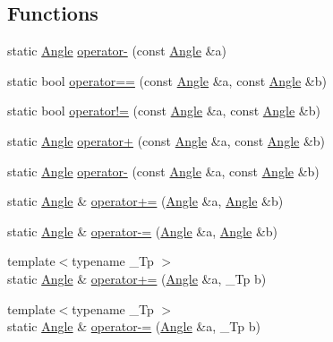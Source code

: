 \subsection*{Functions}
\begin{DoxyCompactItemize}
\item 
static \hyperlink{classnubot_1_1Angle}{Angle} \hyperlink{namespacenubot_aa8ca6af34711fca90938c0880bb15c49}{operator-\/} (const \hyperlink{classnubot_1_1Angle}{Angle} \&a)
\item 
static bool \hyperlink{namespacenubot_af329ad82a05c28a0fc51c500e537fe55}{operator==} (const \hyperlink{classnubot_1_1Angle}{Angle} \&a, const \hyperlink{classnubot_1_1Angle}{Angle} \&b)
\item 
static bool \hyperlink{namespacenubot_a40e374c97f88169b69143eb1d923d496}{operator!=} (const \hyperlink{classnubot_1_1Angle}{Angle} \&a, const \hyperlink{classnubot_1_1Angle}{Angle} \&b)
\item 
static \hyperlink{classnubot_1_1Angle}{Angle} \hyperlink{namespacenubot_abb3de2047a7eae0cfc3700ef06c42531}{operator+} (const \hyperlink{classnubot_1_1Angle}{Angle} \&a, const \hyperlink{classnubot_1_1Angle}{Angle} \&b)
\item 
static \hyperlink{classnubot_1_1Angle}{Angle} \hyperlink{namespacenubot_a178d1f0ed2ef537f9e364bbd5596f65a}{operator-\/} (const \hyperlink{classnubot_1_1Angle}{Angle} \&a, const \hyperlink{classnubot_1_1Angle}{Angle} \&b)
\item 
static \hyperlink{classnubot_1_1Angle}{Angle} \& \hyperlink{namespacenubot_a61c07c4190cbbde322307bcf1152bb84}{operator+=} (\hyperlink{classnubot_1_1Angle}{Angle} \&a, \hyperlink{classnubot_1_1Angle}{Angle} \&b)
\item 
static \hyperlink{classnubot_1_1Angle}{Angle} \& \hyperlink{namespacenubot_a9f354e0f2d292ee266b97e92ff8d3e2d}{operator-\/=} (\hyperlink{classnubot_1_1Angle}{Angle} \&a, \hyperlink{classnubot_1_1Angle}{Angle} \&b)
\item 
{\footnotesize template$<$typename \-\_\-\-Tp $>$ }\\static \hyperlink{classnubot_1_1Angle}{Angle} \& \hyperlink{namespacenubot_a74ae3fab7d3549c26fe7f9522ad0c269}{operator+=} (\hyperlink{classnubot_1_1Angle}{Angle} \&a, \-\_\-\-Tp b)
\item 
{\footnotesize template$<$typename \-\_\-\-Tp $>$ }\\static \hyperlink{classnubot_1_1Angle}{Angle} \& \hyperlink{namespacenubot_a8b3e71c1f93f2750899624ab045dc8ed}{operator-\/=} (\hyperlink{classnubot_1_1Angle}{Angle} \&a, \-\_\-\-Tp b)

\end{DoxyCompactItemize}
